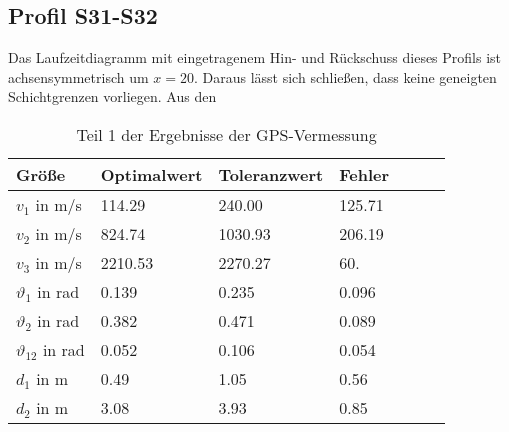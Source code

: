 \subsection{Profil S31-S32}

Das Laufzeitdiagramm mit eingetragenem Hin- und Rückschuss dieses Profils ist achsensymmetrisch um $x=20$. Daraus lässt sich schließen, dass keine geneigten Schichtgrenzen vorliegen. Aus den 



\begin{table}[!ht]
\centering
\caption{Teil 1 der Ergebnisse der GPS-Vermessung}
\label{tab:gps1}
\begin{tabular}{lllllll}
\toprule
Größe   & Optimalwert   & Toleranzwert   & Fehler \\
\midrule
$v_1$ in m/s & 114.29 & 240.00 &  125.71\\
$v_2$ in m/s & 824.74 & 1030.93 & 206.19 \\
$v_3$ in m/s & 2210.53 & 2270.27 & 60. \\
$\vartheta_1$ in rad & 0.139 & 0.235 & 0.096  \\
$\vartheta_2$ in rad & 0.382 & 0.471 & 0.089 \\
$\vartheta_{12}$ in rad & 0.052 & 0.106 & 0.054 \\
$d_1$ in m & 0.49 & 1.05 & 0.56 \\
$d_2$ in m & 3.08 & 3.93 & 0.85 \\

\bottomrule
\end{tabular}
\end{table}







